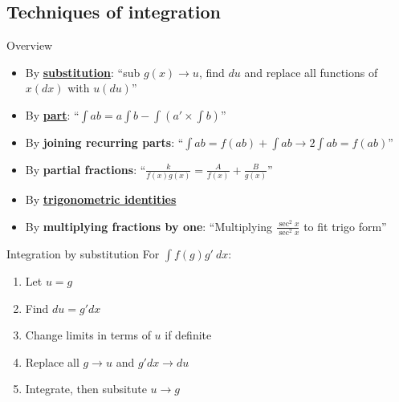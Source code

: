 \documentclass{article}
\begin{document}
\label{sec:integrationtech}
\subsection{Techniques of integration}
\begin{knBox}
    {Overview}
    \begin{itemize}
        \item By \hyperref[sec:intsub]{\textbf{substitution}}: “sub $g(x)\to u$, find $du$ and replace all functions of $x(dx)$ with $u(du)$”
        \item By \hyperref[sec:intpart]{\textbf{part}}: “$\int ab=a\int b-\int (a'\times \int b)$”
        \item By \textbf{joining recurring parts}: “$\int ab=f(ab)+\int ab\to 2\int ab = f(ab)$”
        \item By \textbf{partial fractions}: “$\frac{k}{f(x)g(x)}=\frac{A}{f(x)}+\frac{B}{g(x)}$”
        \item By \hyperref[sec:inttrigo]{\textbf{trigonometric identities}}
        \item By \textbf{multiplying fractions by one}: “Multiplying $\frac{\sec^2x}{\sec^2x}$ to fit trigo form”
    \end{itemize}
\end{knBox}

\label{sec:intsub}
\begin{theorem}
    {Integration by substitution}
    For $\int f(g)g'\:dx$:
    \begin{enumerate}
        \item Let $u=g$
        \item Find $du=g'dx$
        \item Change limits in terms of $u$ if definite
        \item Replace all $g\to u$ and $g'dx\to du$
        \item Integrate, then subsitute $u\to g$
    \end{enumerate}
\end{theorem}
\end{document}
